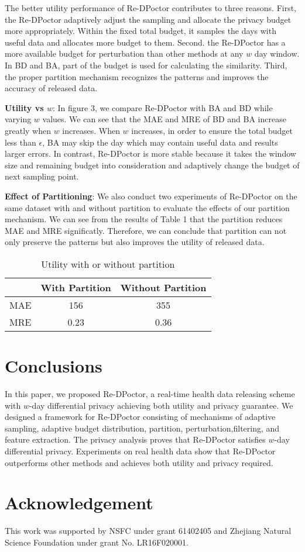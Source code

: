 \documentclass[10pt,conference]{IEEEtran}
\begin{document}
The better utility performance of Re-DPoctor contributes to three reasons. First, the Re-DPoctor adaptively adjust the sampling and allocate the privacy budget more appropriately. Within the fixed total budget, it samples the days with useful data and allocates more budget to them. Second. the Re-DPoctor has a more available budget for perturbation than other methods at any $w$ day window. In BD and BA, part of the budget is used for calculating the similarity. Third, the proper partition mechanism recognizes the patterns and improves the accuracy of released data.

\textbf{Utility vs $w$}:
In figure 3, we compare Re-DPoctor with BA and BD while varying $w$ values. We can see that the MAE and MRE of BD and BA increase greatly when $w$ increases. When $w$ increases, in order to ensure the total budget less than $\epsilon$, BA may skip the day which may contain useful data and results larger errors. In contrast, Re-DPoctor is more stable because it takes the window size and remaining budget into consideration and adaptively change the budget of next sampling point.

\textbf{Effect of Partitioning}: 
We also conduct two experiments of Re-DPoctor on the same dataset with and without partition to evaluate the effects of our partition mechanism. We can see from the results of Table 1 that the partition reduces MAE and MRE significatly. Therefore, we can conclude that partition can not only preserve the patterns but also improves the utility of released data.

\begin{table}
	\renewcommand{\arraystretch}{1.2}
	\caption{Utility with or without partition}
	\label{Utility with or without partition}
	\centering
	\begin{tabular}{|c||c|c|}
		\hline
		& With Partition & Without Partition\\
		\hline
		MAE & 156 & 355\\
		\hline
		MRE & 0.23 & 0.36\\
		\hline
	\end{tabular}
\end{table}

\section{Conclusions}
In this paper, we proposed Re-DPoctor, a real-time health data releasing scheme with $w$-day differential privacy achieving both utility and privacy guarantee. We designed a framework for Re-DPoctor consisting of mechanisms of adaptive sampling, adaptive budget distribution, partition, perturbation,ﬁltering, and feature extraction. The privacy analysis proves that Re-DPoctor satisﬁes $w$-day differential privacy. Experiments on real health data show that Re-DPoctor outperforms other methods and achieves both utility and privacy required.

\section*{Acknowledgement}
This work was supported by NSFC under grant 61402405 and Zhejiang Natural Science Foundation under grant No. LR16F020001.





\end{document}
